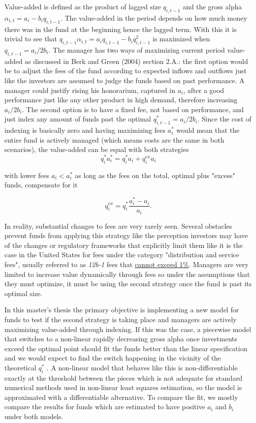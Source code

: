 \documentclass[12pt]{article}
\begin{document}
Value-added is defined as the product of lagged size $q_{i,t-1}$ and the gross alpha $\alpha_{i,t}=a_i-b_iq_{i,t-1}$. The value-added in the period depends on how much money there was in the fund at the beginning hence the lagged term. With this it is trivial to see that $q_{i,t-1}\alpha_{i,t}=a_iq_{i,t-1}-b_iq_{i,t-1}^2$ is maximized when $q_{i,t-1}=a_i/2b_i$. The manager has two ways of maximizing current period value-added as discussed in Berk and Green (2004) section 2.A.: the first option would be to adjust the fees of the fund according to expected inflows and outflows just like the investors are assumed to judge the funds based on past performance. A manager could justify rising his honorarium, captured in $a_i$, after a good performance just like any other product in high demand, therefore increasing $a_i/2b_i$.  The second option is to have a fixed fee, not based on performance, and just index any amount of funds past the optimal $q_{i,t-1}^*=a_i/2b_i$. Since the cost of indexing is basically zero and having maximizing fees $a_i^*$ would mean that the entire fund is actively managed (which means costs are the same in both scenarios), the value-added can be equal with both strategies 
$$
q_{i}^*a_{i}^*=q_{i}^*a_{i}+q_{i}^{ex}a_{i} 
$$

with lower fees $a_i<a_{i}^*$ as long as the fees on the total, optimal plus "excess" funds, compensate for it 


$$
q_{i}^{ex}=q_{i}^{*}\frac{a_i^*-a_i}{a_i}.
$$

In reality, substantial changes to fees are very rarely seen. Several obstacles prevent funds from applying this strategy like the perception investors may have of the changes or regulatory frameworks that explicitly limit them like it is the case in the United States for fees under the category "distribution and service fees", usually referred to as \textit{12b-1} fees that \href{\detokenize{https://www.finra.org/rules-guidance/key-topics/mutual-funds#:~:text=FINRA%20Rule%202341(d)%20prohibits,1%20fee%2C%20and%20whether%20the}}{cannot exceed 1\%}.
Managers are very limited to increase value dynamically through fees so under the assumptions that they must optimize, it must be using the second strategy once the fund is past its optimal size. \par

In this master's thesis the primary objective is implementing a new model for funds to test if the second strategy is taking place and managers are actively maximizing value-added through indexing. If this was the case, a piecewise model that switches to a non-linear rapidly decreasing gross alpha once investments exceed the optimal point should fit the funds better than the linear specification and we would expect to find the switch happening in the vicinity of the theoretical $q_{i}^*$ . A non-linear model that behaves like this is non-differentiable exactly at the threshold between the pieces which is not adequate for standard numerical methods used in non-linear least squares estimation, so the model is approximated with a differentiable alternative. To compare the fit, we mostly compare the results for funds which are estimated to have positive $a_i$ and $b_i$ under both models.
\end{document}
